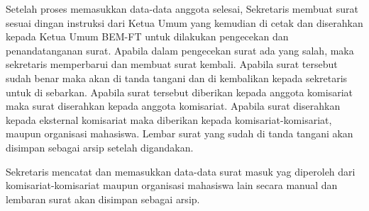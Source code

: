 \documentclass{jtetiproposalskripsi}
\begin{document}
Setelah proses memasukkan data-data anggota selesai, Sekretaris membuat surat sesuai dingan instruksi dari Ketua Umum yang kemudian di cetak dan diserahkan kepada Ketua Umum BEM-FT untuk dilakukan pengecekan dan penandatanganan surat. Apabila dalam pengecekan surat ada yang salah, maka sekretaris memperbarui dan membuat surat kembali. Apabila surat tersebut sudah benar maka akan di tanda tangani dan di kembalikan kepada sekretaris untuk di sebarkan. Apabila surat tersebut diberikan kepada anggota komisariat maka surat diserahkan kepada anggota komisariat. Apabila surat diserahkan kepada eksternal komisariat maka diberikan kepada komisariat-komisariat, maupun organisasi mahasiswa. Lembar surat yang sudah di tanda tangani akan disimpan sebagai arsip setelah digandakan.

Sekretaris mencatat dan memasukkan data-data surat masuk yag diperoleh dari komisariat-komisariat maupun organisasi mahasiswa lain secara manual dan lembaran surat akan disimpan sebagai arsip.
\newpage
\end{document}
